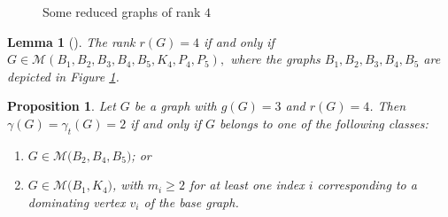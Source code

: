 \documentclass[12pt]{amsart}
\theoremstyle{plain}
\newtheorem{lemma}[theorem]{Lemma}
\newtheorem{proposition}[theorem]{Proposition}
\theoremstyle{definition}
\begin{document}
\begin{figure}
		\caption{Some reduced graphs of rank $4$}
		\label{fig:rank 4 graphs}	
	\end{figure}

\begin{lemma}[\cite{Rank-4-graph-LAA}]\label{lemma: cha of graphs of rank 4}
The rank $r(G)=4$ if and only if $G\in \mathcal{M}(B_1, B_2, B_3, B_4, B_5, K_4, P_4, P_5),$ where the graphs $B_1, B_2, B_3, B_4, B_5$ are depicted in Figure \ref{fig:rank 4 graphs}.
\end{lemma}

\begin{proposition}\label{prop:rank-4-d-td=2}
Let $G$ be a graph with $g(G)=3$ and $r(G)=4$. Then $\gamma(G)=\gamma_t(G)=2$ if and only if $G$ belongs to one of the following classes:
\begin{enumerate}
\item $G\in\mathcal{M}\bigl(B_2,B_4,B_5\bigr)$; or
\item $G\in\mathcal{M}\bigl(B_1,K_4\bigr)$, with $m_i\geq 2$ for at least one index $i$ corresponding to a dominating vertex $v_i$ of the base graph.
\end{enumerate}
\end{proposition}
\end{document}
